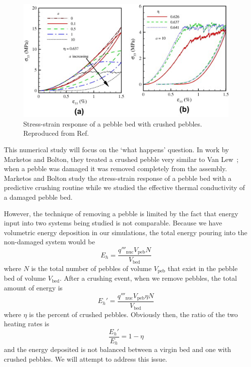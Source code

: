 \begin{figure}[!t]
\centering
	\includegraphics[]{chapters/figures/annabattula-stress-strain-crushing.jpg}
	\caption{Stress-strain response of a pebble bed with crushed pebbles. Reproduced from Ref.~\cite{Annabattula2012a}}
	\label{fig:annabattula-stress-strain}
\end{figure}

This numerical study will focus on the `what happens' question. In work by Marketos and Bolton, they treated a crushed pebble very similar to Van Lew\etal~; when a pebble was damaged it was removed completely from the assembly.\cite{Marketos2007,VanLew2014} Marketos and Bolton study the stress-strain response of a pebble bed with a predictive crushing routine while we studied the effective thermal conductivity of a damaged pebble bed.

However, the technique of removing a pebble is limited by the fact that energy input into two systems being studied is not comparable. Because we have volumetric energy deposition in our simulations, the total energy pouring into the non-damaged system would be
\begin{equation}
	E_h = \frac{q'''_\text{nuc} V_\text{peb} N}{V_\text{bed}}
\end{equation}
where $N$ is the total number of pebbles of volume $V_\text{peb}$ that exist in the pebble bed of volume $V_\text{bed}$. After a crushing event, when we remove pebbles, the total amount of energy is
\begin{equation}
	E_h' = \frac{q'''_\text{nuc} V_\text{peb} \eta N}{V_\text{bed}}
\end{equation}
where $\eta$ is the percent of crushed pebbles. Obviously then, the ratio of the two heating rates is\begin{equation}
	\frac{E_h'}{E_h} = 1 - \eta
\end{equation}
and the energy deposited is not balanced between a virgin bed and one with crushed pebbles. We will attempt to address this issue.

